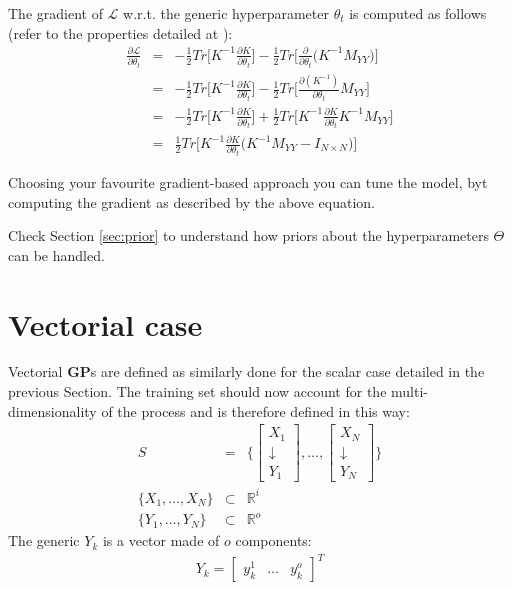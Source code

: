 \documentclass{article}
\begin{document}
The gradient of $\mathcal{L}$ w.r.t. the generic hyperparameter $\theta_t$ is computed as follows (refer to the properties detailed at \cite{CookBook}):
\begin{eqnarray}
\frac{\partial \mathcal{L}}{\partial \theta_t} &=& 
-\frac{1}{2} Tr \bigg [ K^{-1} \frac{\partial K}{\partial \theta_t} \bigg ]
-\frac{1}{2} Tr \bigg [ \frac{\partial }{\partial \theta_t} \big (  
K^{-1} M_{YY}
\big ) \bigg ] \\
&=& -\frac{1}{2} Tr \bigg [ K^{-1} \frac{\partial K}{\partial \theta_t} \bigg ]
-\frac{1}{2} Tr \bigg [ \frac{\partial (K^{-1}) }{\partial \theta_t} M_{YY} \bigg ] \\
&=& -\frac{1}{2} Tr \bigg [ K^{-1} \frac{\partial K}{\partial \theta_t} \bigg ]
+\frac{1}{2} Tr \bigg [ K^{-1} \frac{\partial K}{\partial \theta_t} K^{-1} M_{YY} \bigg ] \\
&=&
\frac{1}{2} Tr \bigg [ K^{-1} \frac{\partial K}{\partial \theta_t} \bigg (K^{-1} M_{YY} - I_{N \times N} \bigg ) \bigg ]
 \label{eq:L_grad}
\end{eqnarray}

Choosing your favourite gradient-based approach you can tune the model, byt computing the gradient as described by the above equation.

Check Section \ref{sec:prior} to understand how priors about the hyperparameters $\Theta$ can be handled.

\section{Vectorial case}
\label{sec:vectorial}

Vectorial \textbf{GP}s are defined as similarly done for the scalar case detailed in the previous Section.
The training set should now account for the multi-dimensionality of the process and is therefore defined in this way:
\begin{eqnarray}
S &=& 
\bigg \lbrace 
\begin{bmatrix} X_1 \\ \downarrow \\ Y_1 \end{bmatrix}, 
\hdots,  
\begin{bmatrix} X_N \\ \downarrow \\ Y_N \end{bmatrix}
\bigg \rbrace \\
\big \lbrace X_1, \hdots, X_N \big \rbrace &\subset & \mathbb{R}^i \\
\big \lbrace Y_1, \hdots, Y_N \big \rbrace &\subset & \mathbb{R}^o
\end{eqnarray}
The generic $Y_k$ is a vector made of $o$ components:
\begin{eqnarray}
Y_k = \begin{bmatrix} y_k^1 & \hdots & y_k^o \end{bmatrix}^T
\end{eqnarray}
\end{document}
